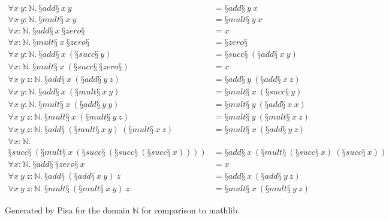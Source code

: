 \begin{conjectureset}[H]
\begin{align}
\forall x\ y: \mathbb{N}.\ §add§\ x\ y &= §add§\ y\ x \label{overlaprecursive:add_comm1}\\
\forall x\ y: \mathbb{N}.\ §mult§\ x\ y &= §mult§\ y\ x \label{overlaprecursive:mul_comm1}\\
\forall x: \mathbb{N}.\ §add§\ x\ §zero§ &= x \label{overlaprecursive:false_positive1}\\
\forall x: \mathbb{N}.\ §mult§\ x\ §zero§ &= §zero§ \label{overlaprecursive:mul_zero1}\\
\forall x\ y: \mathbb{N}.\ §add§\ x\ (§succ§\ y) &= §succ§\ (§add§\ x\ y)\label{overlaprecursive:add_succ1}\\
\forall x: \mathbb{N}.\ §mult§\ x\ (§succ§\ §zero§) &= x \label{overlaprecursive:mul_one1}\\
\forall x\ y\ z: \mathbb{N}.\ §add§\ x\ (§add§\ y\ z) &= §add§\ y\ (§add§\ x\ z)\label{overlaprecursive:add_left_comm1}\\
\forall x\ y: \mathbb{N}.\ §add§\ x\ (§mult§\ x\ y) &= §mult§\ x\ (§succ§\ y)\label{overlaprecursive:mul_succ1}\\
\forall x\ y: \mathbb{N}.\ §mult§\ x\ (§add§\ y\ y) &= §mult§\ y\ (§add§\ x\ x)\label{overlaprecursive:false_positive2}\\
\forall x\ y\ z: \mathbb{N}.\ §mult§\ x\ (§mult§\ y\ z) &= §mult§\ y\ (§mult§\ x\ z)\label{overlaprecursive:mul_left_comm1}\\
\forall x\ y\ z: \mathbb{N}.\ §add§\ (§mult§\ x\ y)\ (§mult§\ x\ z) &= §mult§\ x\ (§add§\ y\ z)\label{overlaprecursive:left_distrib1}\\
\forall x: \mathbb{N}.\ \nonumber \\
  §succ§\ (§mult§\ x\ (§succ§\ (§succ§\ (§succ§\ x)))) &= §add§\ x\ (§mult§\ (§succ§\ x)\ (§succ§\ x))\label{overlaprecursive:false_positive3}\\
\forall x: \mathbb{N}.\ §add§\ §zero§\ x &= x \label{overlaprecursive:zero_add1}\\
\forall x\ y\ z: \mathbb{N}.\ §add§\ (§add§\ x\ y)\ z &= §add§\ x\ (§add§\ y\ z) \label{overlaprecursive:add_assoc1}\\
\forall x\ y\ z: \mathbb{N}.\ §mult§\ (§mult§\ x\ y)\ z &= §mult§\ x\ (§mult§\ y\ z) \label{overlaprecursive:mul_assoc1}
\end{align}
\vspace{-0.9cm}
\caption{Generated by Pisa for the domain $\mathbb{N}$ for comparison to mathlib.}\label{eqs:recursive:compare}
\end{conjectureset}

